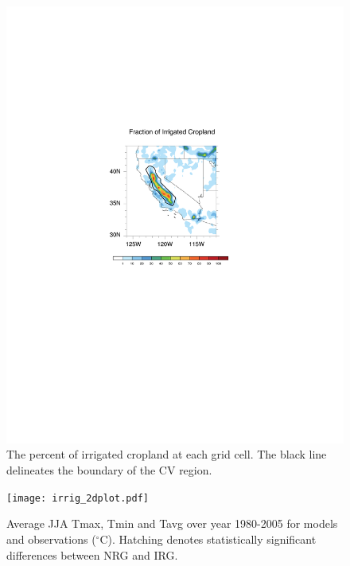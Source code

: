 \documentclass[draft,ms]{agutex}   %
\begin{document}
\begin{figure}
\begin{center}
\includegraphics[width=6in]{irrigatedArea.pdf}
\caption{The percent of irrigated cropland at each grid cell.  The black line delineates the boundary of the CV region.}
\label{fig:Figure 2}
\end{center}
\end{figure}

\begin{figure}
\begin{center}
\texttt{[image: irrig\_2dplot.pdf]}
\caption{Average JJA Tmax, Tmin and Tavg over year 1980-2005 for models and observations ($^\circ$C). Hatching denotes statistically significant differences between NRG and IRG.}
\label{fig:Figure 3}
\end{center}
\end{figure}
\end{document}
